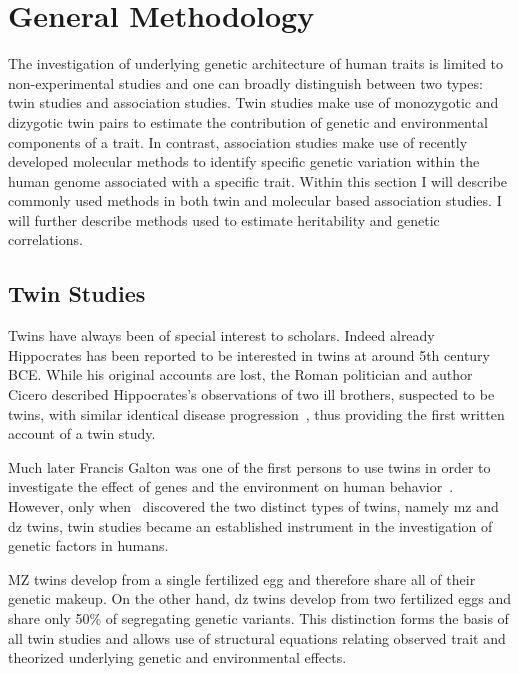 \chapter{General Methodology}
\label{cha:methods_applied_in_genetic_studies_on_humans}

The investigation of underlying genetic architecture of human traits is limited to non-experimental studies and one can broadly distinguish between two types: twin studies and association studies.
Twin studies make use of monozygotic and dizygotic twin pairs to estimate the contribution of genetic and environmental components of a trait.
In contrast, association studies make use of recently developed molecular methods to identify specific genetic variation within the human genome associated with a specific trait.
Within this section I will describe commonly used methods in both twin and molecular based association studies.
I will further describe methods used to estimate heritability and genetic correlations.

\section{Twin Studies}
\label{sec:twin_based_studies}

Twins have always been of special interest to scholars.
Indeed already Hippocrates has been reported to be interested in twins at around 5th century BCE\@.
While his original accounts are lost, the Roman politician and author Cicero described Hippocrates's observations of two ill brothers, suspected to be twins, with similar identical disease progression~\cite{Cicero44BC},
thus providing the first written account of a twin study.

Much later Francis Galton was one of the first persons to use twins in order to investigate the effect of genes and the environment on human behavior~\cite{Rende1990}.
However, only when~\citet{Simens1924} discovered the two distinct types of twins, namely \acrfull{mz} and \acrfull{dz} twins, twin studies became an established instrument in the investigation of genetic factors in humans.

MZ twins develop from a single fertilized egg and therefore share all of their genetic makeup.
On the other hand, \acrshort{dz} twins develop from two fertilized eggs and share only 50\% of segregating genetic variants.
This distinction forms the basis of all twin studies and allows use of structural equations relating observed trait and theorized underlying genetic and environmental effects.

